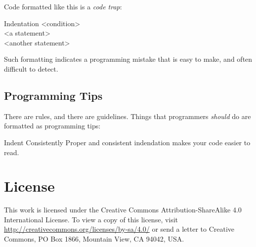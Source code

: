 Code formatted like this is a \textit{code trap}:
\begin{trap*}{Indentation}
<condition>\\
\phantom{xxxx}<a statement>\\
\phantom{xxxx}<another statement>
\end{trap*}

Such formatting indicates a programming mistake that is easy to make, and often difficult to detect.

\subsection*{Programming Tips}

There are rules, and there are guidelines.  Things that programmers \textit{should} do are formatted as programming tips:

\begin{tip*}{Indent Consistently}
    Proper and consistent indendation makes your code easier to read.
\end{tip*}

\section*{License}

This work is licensed under the Creative Commons Attribution-ShareAlike 4.0 International License. To view a copy of this license, visit \href{http://creativecommons.org/licenses/by-sa/4.0/}{http://creativecommons.org/licenses/by-sa/4.0/} or send a letter to Creative Commons, PO Box 1866, Mountain View, CA 94042, USA.


